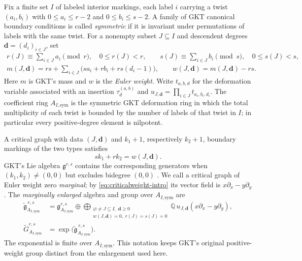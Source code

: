 \documentclass[11pt]{amsart}
\theoremstyle{definition}
\theoremstyle{remark}
\newcommand{\QQ}{\mathbb{Q}}
\newcommand{\gfrak}{\mathfrak{g}}
\begin{document}
Fix a finite set $I$ of labeled interior markings, each label $i$ carrying a
twist $(a_i,b_i)$ with $0\le a_i\le r-2$ and $0\le b_i\le s-2$.  A family of
GKT canonical boundary conditions is called \emph{symmetric} if it is invariant
under permutations of labels with the same twist.  For a nonempty subset
$J\subseteq I$ and descendent degrees $\mathbf d=(d_i)_{i\in J}$, set
\begin{gather}
 r(J)\equiv\sum_{i\in J}a_i\pmod r,\quad 0\le r(J)<r,
 \qquad
 s(J)\equiv\sum_{i\in J}b_i\pmod s,\quad 0\le s(J)<s,\label{eq:residues}\\
 m(J,\mathbf d)
 =rs+\sum_{i\in J}\bigl(sa_i+rb_i+rs(d_i-1)\bigr),
 \qquad w(J,\mathbf d)=m(J,\mathbf d)-rs.\label{eq:massweight}
\end{gather}
Here $m$ is GKT's mass and $w$ is the \emph{Euler weight}.  Write
$t_{a,b,d}$ for the deformation variable associated with an insertion
$\tau_d^{(a,b)}$ and
$u_{J,\mathbf d}=\prod_{i\in J}t_{a_i,b_i,d_i}$.  The coefficient ring
$A_{I,\mathrm{sym}}$ is the symmetric GKT deformation ring in which the total
multiplicity of each twist is bounded by the number of labels of that twist
in $I$; in particular every positive-degree element is nilpotent.

A critical graph with data $(J,\mathbf d)$ and $k_1+1$, respectively
$k_2+1$, boundary markings of the two types satisfies
\begin{equation}
 sk_1+rk_2=w(J,\mathbf d).
 \label{eq:criticalweight-intro}
\end{equation}
GKT's Lie algebra $\gfrak^{r,s}$ contains the corresponding generators when
$(k_1,k_2)\ne(0,0)$ but excludes bidegree $(0,0)$
\cite[Def.~4.23]{GKT}.  We call a critical graph of Euler weight zero
\emph{marginal}; by \eqref{eq:criticalweight-intro} its vector field is
$x\partial_x-y\partial_y$.  The \emph{marginally enlarged} algebra and group
over $A_{I,\mathrm{sym}}$ are
\begin{equation}
\begin{aligned}
 \widetilde{\gfrak}^{\,r,s}_{A_{I,\mathrm{sym}}}
 &=\gfrak^{r,s}_{A_{I,\mathrm{sym}}}
 \oplus\!\!\bigoplus_{\substack{\varnothing\ne J\subseteq I,\;\mathbf d\ge0\\
 w(J,\mathbf d)=0,\;r(J)=s(J)=0}}
 \QQ\,u_{J,\mathbf d}(x\partial_x-y\partial_y),\\
 \widetilde G^{r,s}_{A_{I,\mathrm{sym}}}
 &=\exp\bigl(\widetilde{\gfrak}^{\,r,s}_{A_{I,\mathrm{sym}}}\bigr).
\end{aligned}
\label{eq:enlargedgroup}
\end{equation}
The exponential is finite over $A_{I,\mathrm{sym}}$.  This notation keeps
GKT's original positive-weight group distinct from the enlargement used here.
\end{document}
